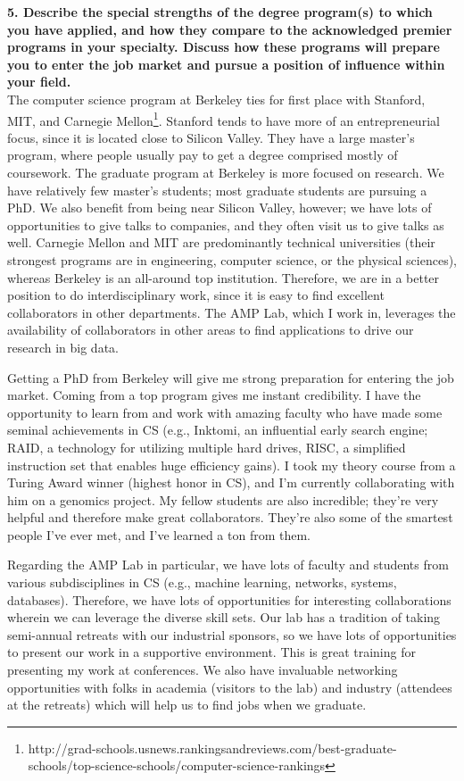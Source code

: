 \documentclass{article}
\begin{document}
\pagestyle{plain}

\noindent\textbf{5.  Describe the special strengths of the degree program(s) to which you have applied, and how they compare to the acknowledged premier programs in your specialty. Discuss how these programs will prepare you to enter the job market and pursue a position of influence within your field.}\\

The computer science program at Berkeley ties for first place with Stanford, MIT, and Carnegie Mellon\footnote{http://grad-schools.usnews.rankingsandreviews.com/best-graduate-schools/top-science-schools/computer-science-rankings}.  
Stanford tends to have more of an entrepreneurial focus, since it is located close to Silicon Valley.  
They have a large master's program, where people usually pay to get a degree comprised mostly of coursework.
The graduate program at Berkeley is more focused on research.  We have relatively few master's students; most graduate students are pursuing a PhD.
We also benefit from being near Silicon Valley, however; we have lots of opportunities to give talks to companies, and they often visit us to give talks as well.
Carnegie Mellon and MIT are predominantly technical universities (their strongest programs are in engineering, computer science, or the physical sciences), whereas Berkeley is an all-around top institution.  
Therefore, we are in a better position to do interdisciplinary work, since it is easy to find excellent collaborators in other departments.
The AMP Lab, which I work in, leverages the availability of collaborators in other areas to find applications to drive our research in big data.

Getting a PhD from Berkeley will give me strong preparation for entering the job market.
Coming from a top program gives me instant credibility.
I have the opportunity to learn from and work with amazing faculty who have made some seminal achievements in CS (e.g., Inktomi, an influential early search engine; RAID, a technology for utilizing multiple hard drives, RISC, a simplified instruction set that enables huge efficiency gains).
I took my theory course from a Turing Award winner (highest honor in CS), and I'm currently collaborating with him on a genomics project.
My fellow students are also incredible; they're very helpful and therefore make great collaborators.
They're also some of the smartest people I've ever met, and I've learned a ton from them.

Regarding the AMP Lab in particular, we have lots of faculty and students from various subdisciplines in CS (e.g., machine learning, networks, systems, databases).
Therefore, we have lots of opportunities for interesting collaborations wherein we can leverage the diverse skill sets.
Our lab has a tradition of taking semi-annual retreats with our industrial sponsors, so we have lots of opportunities to present our work in a supportive environment.
This is great training for presenting my work at conferences.
We also have invaluable networking opportunities with folks in academia (visitors to the lab) and industry (attendees at the retreats) which will help us to find jobs when we graduate.
\end{document}
